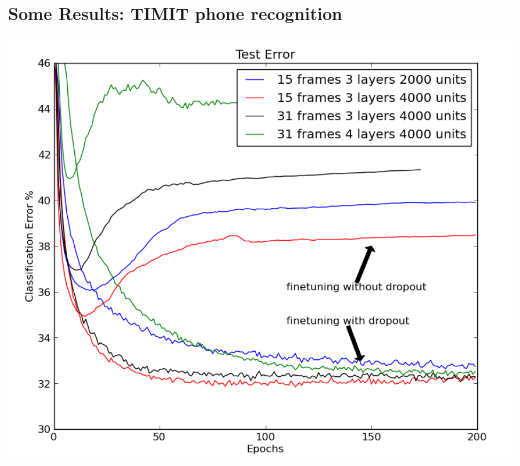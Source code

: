 \begin{frame}
\frametitle{Some Results: TIMIT phone recognition}
\centerline{\includegraphics[scale=0.3]{figs/dropout_timit}}
\end{frame}

